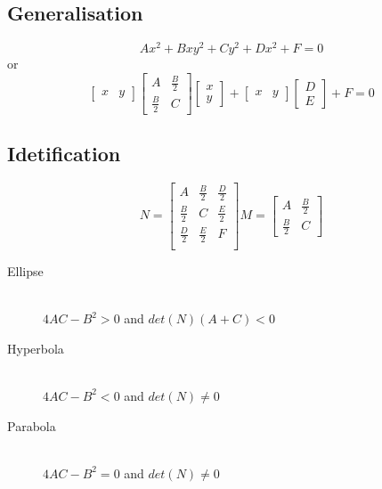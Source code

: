 \documentclass[11pt,twoside,a4paper]{article}
\begin{document}
    \subsection{Generalisation}
      \[ Ax^2 + Bxy^2 + Cy^2 + Dx^2 + F = 0 \]
      or
      \[
        \begin{bmatrix} x & y \end{bmatrix}
        \begin{bmatrix}
          A           & \frac{B}{2} \\[0.3em]
          \frac{B}{2} & C
        \end{bmatrix}
        \begin{bmatrix} x \\ y \end{bmatrix}
        +
        \begin{bmatrix} x & y \end{bmatrix}
        \begin{bmatrix} D \\ E \end{bmatrix}
        + F = 0
      \]
    
    \subsection{Idetification}
      \[
        N =
          \begin{bmatrix}
            A           & \frac{B}{2} & \frac{D}{2} \\[0.3em]
            \frac{B}{2} & C           & \frac{E}{2} \\[0.3em]
            \frac{D}{2} & \frac{E}{2} & F           \\
          \end{bmatrix}
        M =
          \begin{bmatrix}
            A           & \frac{B}{2} \\[0.3em]
            \frac{B}{2} & C
          \end{bmatrix}
      \]
      \begin{description}
        \item[Ellipse] \hfill \\
          \( 4AC - B^2 > 0 \) and \( det(N)(A+C) < 0 \)
        
        \item[Hyperbola] \hfill \\
          \( 4AC - B^2 < 0 \) and \( det(N) \neq 0 \)
        
        \item[Parabola] \hfill \\
          \( 4AC - B^2 = 0 \) and \( det(N) \neq 0 \)
      \end{description}
  
\end{document}
